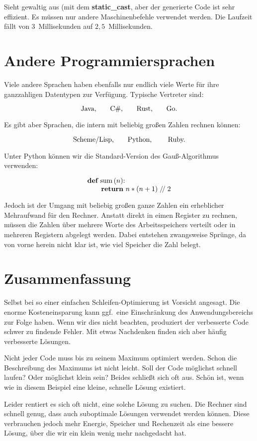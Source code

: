 Sieht gewaltig aus (mit dem {\bf static\_cast}, aber
der generierte Code ist sehr effizient.
Es müssen nur andere Maschinenbefehle verwendet werden.
Die Laufzeit fällt von 3~Millisekunden auf $2{,}5$~Millisekunden.

\section{Andere Programmiersprachen}%
%
Viele andere Sprachen haben ebenfalls nur endlich viele Werte für ihre
ganzzahligen Datentypen zur Verfügung.
Typische Vertreter sind:

$$\hbox{Java,\qquad C\#,\qquad Rust,\qquad Go.}$$

\noindent Es gibt aber Sprachen, die intern mit beliebig großen
Zahlen rechnen können:

$$\hbox{Scheme/Lisp,\qquad Python, \qquad Ruby.}$$

\noindent Unter Python können wir die Standard-Version des Gauß-Algorithmus verwenden:

$$\vbox{\halign{#\hfil\cr
{\bf def} sum$\,$($n$):\cr
\qquad {\bf return} $n * (n + 1) \mathrel{/\!/} 2$\cr}}$$

\noindent Jedoch ist der Umgang mit beliebig großen ganze Zahlen
ein erheblicher Mehraufwand für den Rechner.
Anstatt direkt in eimen Register zu rechnen, müssen die
Zahlen über mehrere Worte des Arbeitsspeichers verteilt
oder in mehreren Registern abgelegt werden.
Dabei entstehen zwangsweise Sprünge, da von vorne herein
nicht klar ist, wie viel Speicher die Zahl belegt.

\section{Zusammenfassung}%
%
Selbst bei so einer einfachen Schleifen-Optimierung ist
Vorsicht angesagt.
Die enorme Kosteneinsparung kann ggf.\ eine Einschränkung
des Anwendungsbereichs zur Folge haben.
Wenn wir dies nicht beachten, produziert der verbesserte
Code schwer zu findende Fehler.
Mit etwas Nachdenken finden sich aber häufig verbesserte
Lösungen.

Nicht jeder Code muss bis zu seinem Maximum optimiert
werden.
Schon die Beschreibung des Maximums ist nicht leicht.
Soll der Code möglichst schnell laufen?
Oder möglichst klein sein?
Beides schließt sich oft aus.
Schön ist, wenn wie in diesem Beispiel eine kleine,
schnelle Lösung existiert.

Leider rentiert es sich oft nicht, eine solche Lösung
zu suchen.
Die Rechner sind schnell genug, dass auch suboptimale
Lösungen verwendet werden können.
Diese verbrauchen jedoch mehr Energie, Speicher und
Rechenzeit als eine bessere Lösung, über die wir ein
klein wenig mehr nachgedacht hat.

